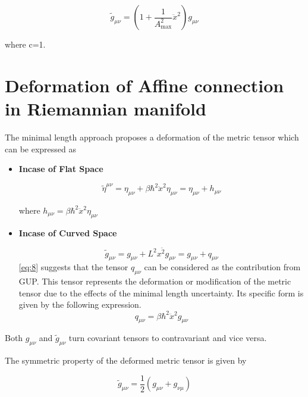 \documentclass{article}
\begin{document}
\begin{equation}
\widetilde{g}_{\mu\nu} = \left(1 + \frac{1}{{A^2_{\text{max}}}} \ddot{x}^2\right)g_{\mu\nu}
\label{16}
\end{equation}

where c=1.


\section{\Large Deformation of Affine connection in Riemannian manifold}

The minimal length approach proposes a deformation of the metric tensor which can be expressed as 

\begin{itemize}

\item \textbf{Incase of Flat Space}

\begin{equation}
    \tilde{\eta}^{\mu\nu} = \eta_{\mu\nu} + \beta\hbar^2 \ddot x^2 \eta_{\mu\nu} = \eta_{\mu\nu} + h_{\mu\nu}
\label{30}
\end{equation}

where $h_{\mu\nu} = \beta \hbar^2 \ddot x^2 \eta_{\mu\nu}$

\item  \textbf{Incase of Curved Space}


\begin{equation}
    \tilde{g}_{\mu\nu} = g_{\mu\nu} + L^2 x\ddot{^2} g_{\mu\nu} = g_{\mu\nu} + q_{\mu\nu}
    \label{28}
\end{equation}
\eqref{eq:8} suggests that the tensor $q_{\mu\nu}$ can be considered as the contribution from GUP. This tensor represents the deformation or modification of the metric tensor due to the effects of the minimal length uncertainty. Its specific form is given by the following expression.
\begin{equation}
    q_{\mu\nu} = \beta\hbar^2 \ddot x^2 g_{\mu\nu}
 \label{29}
\end{equation}

\end{itemize}

Both $g_{\mu\nu}$  and  $\tilde{g}_{\mu\nu}$ turn covariant tensors to contravariant and vice versa.

The symmetric property of the deformed metric tensor is given by 

\begin{equation}
   \tilde{g}_{\mu\nu}=\frac{1}{2} (g_{\mu\nu} + g_{\nu\mu})
    \label{36}
\end{equation}
\end{document}
